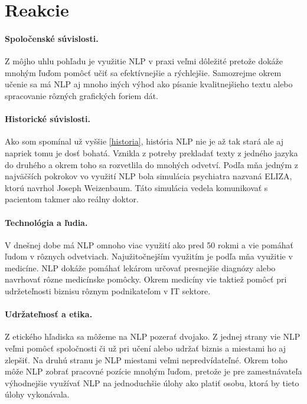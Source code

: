 \documentclass[10pt,slovak,a4paper,twoside]{article}
\begin{document}
\section{Reakcie}\label{reakcie}
\paragraph{Spoločenské súvislosti.}
Z môjho uhlu pohľadu je využitie NLP v praxi veľmi dôležité pretože dokáže mnohým ľuďom pomôcť učiť sa efektívnejšie a rýchlejšie. 
Samozrejme okrem učenie sa má NLP aj mnoho iných výhod ako písanie kvalitnejšieho textu alebo spracovanie rôzných grafických foriem dát.
\paragraph{Historické súvislosti.}
Ako som spomínal už vyššie \ref{historia}, história NLP nie je až tak stará ale aj napriek tomu je dosť bohatá. Vznikla z potreby prekladať
texty z jedného jazyka do druhého a okrem toho sa rozvetlila do mnohých odvetví. Podľa mňa jedným z najväčších pokrokov vo využití NLP bola simulácia psychiatra
nazvaná ELIZA\cite{historia}, ktorú navrhol Joseph Weizenbaum. Táto simulácia vedela komunikovať s pacientom takmer ako reálny doktor.
\paragraph{Technológia a ľudia.}
V dnešnej dobe má NLP omnoho viac využití ako pred 50 rokmi a vie pomáhať ľudom v rôznych odvetviach. Najužitočnejším využitím je podľa mňa využitie v medicíne.
NLP dokáže pomáhať lekárom určovať presnejšie diagnózy alebo navrhovať rôzne medicínske pomôcky. Okrem medicíny vie taktiež pomôcť pri udržeteľnosti biznisu rôznym
podnikateľom v IT sektore.
\paragraph{Udržateľnosť a etika.}
Z etického hľadiska sa môžeme na NLP pozerať dvojako. Z jednej strany vie NLP veľmi pomôcť spoločnosti či už pri učení alebo udržať biznis a miestami ho aj zlepšiť. Na druhú stranu je 
NLP miestami veľmi nepredvídateľné. Okrem toho môže NLP zobrať pracovné pozície mnohým ľuďom, pretože je pre zamestnávateľa výhodnejšie využívať NLP na jednoduchšie
úlohy ako platiť osobu, ktorá by tieto úlohy vykonávala.

 
\end{document}
